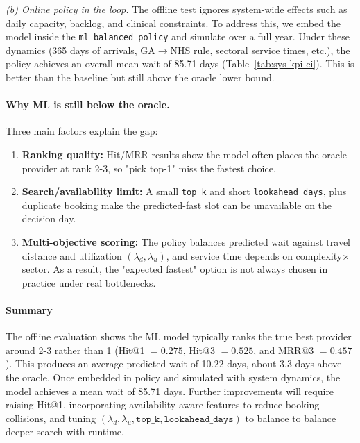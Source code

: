 \documentclass[ %
                    author={Nattanan Nawakitbamrung},
                supervisor={Dr. Sébastien Rochat},
                    degree={MSc},
                     title={Developing and Evaluating the Impact of a Single Patient Treatment List (PTL) for an NHS Integrated Care System},
                  subtitle={},
                      type={},
                      year={2025}]{dissertation}
\begin{document}
\emph{(b) Online policy in the loop.}
The offline test ignores system-wide effects such as daily capacity, backlog, and clinical constraints. To address this, we embed the model inside the \texttt{ml\_balanced\_policy} and simulate over a full year. Under these dynamics (365 days of arrivals, GA$\rightarrow$NHS rule, sectoral service times, etc.), the policy achieves an overall mean wait of 85.71 days (Table~\ref{tab:sys-kpi-ci}). This is better than the baseline but still above the oracle lower bound.

\paragraph{Why ML is still below the oracle.} 
Three main factors explain the gap:
\begin{enumerate}
    \item \textbf{Ranking quality:} Hit/MRR results show the model often places the oracle provider at rank 2-3, so "pick top-1" miss the fastest choice.
    \item \textbf{Search/availability limit:} A small \texttt{top\_k} and short \texttt{lookahead\_days}, plus duplicate booking make the predicted-fast slot can be unavailable on the decision day. 
    \item \textbf{Multi-objective scoring:} The policy balances predicted wait against travel distance and utilization $(\lambda_d,\lambda_u)$, and service time depends on complexity$\times$sector. As a result, the "expected fastest" option is not always chosen in practice under real bottlenecks.
\end{enumerate}

\paragraph{Summary}
The offline evaluation shows the ML model typically ranks the true best provider around 2-3 rather than 1 (Hit@1 $=0.275$, Hit@3 $=0.525$, and MRR@3 $=0.457$). This produces an average predicted wait of 10.22 days, about 3.3 days above the oracle. Once embedded in policy and simulated with system dynamics, the model achieves a mean wait of 85.71 days. Further improvements will require raising Hit@1, incorporating availability-aware features to reduce booking collisions, and tuning $(\lambda_d,\lambda_u,\texttt{top\_k},\texttt{lookahead\_days})$ to balance to balance deeper search with runtime.
\end{document}

